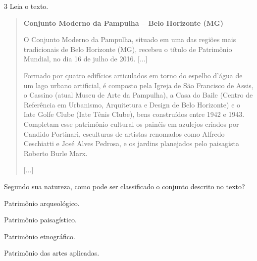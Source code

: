 
\num{3} Leia o texto.

\begin{quote}
\textbf{Conjunto Moderno da Pampulha -- Belo Horizonte (MG)}

O Conjunto Moderno da Pampulha, situado em uma das regiões mais
tradicionais de Belo Horizonte (MG), recebeu o título de Patrimônio
Mundial, no dia 16 de julho de 2016. {[}...{]}

Formado por quatro edifícios articulados em torno do espelho d'água de
um lago urbano artificial, é composto pela Igreja de São Francisco de
Assis, o Cassino (atual Museu de Arte da Pampulha), a Casa do Baile
(Centro de Referência em Urbanismo, Arquitetura e Design de Belo
Horizonte) e o Iate Golfe Clube (Iate Tênis Clube), bens construídos
entre 1942 e 1943. Completam esse patrimônio cultural os painéis em
azulejos criados por Candido Portinari, esculturas de artistas renomados
como Alfredo Ceschiatti e José Alves Pedrosa, e os jardins planejados
pelo paisagista Roberto Burle Marx.

{[}...{]}

\end{quote}

Segundo sua natureza, como pode ser classificado o conjunto descrito no texto?

\begin{escolha}
\item
  Patrimônio arqueológico.
\item
  Patrimônio paisagístico.
\item
  Patrimônio etnográfico.
\item
  Patrimônio das artes aplicadas.
\end{escolha}

